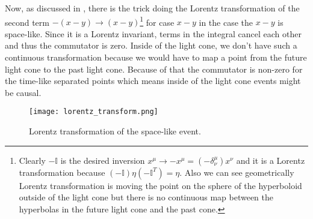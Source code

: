 Now, as discussed in \cite{peskin_schroeder}, there is the trick doing the Lorentz transformation of the second term $-(x - y) \to (x - y)$\footnote{Clearly $-\mathbb{I}$ 
is the desired inversion $x^{\mu} \to -x^{\mu} = (-\delta^{\mu}_{\nu}) x^{\nu}$ and it is a Lorentz transformation because $(-\mathbb{I}) \eta 
(-\mathbb{I}^{T}) = \eta$. Also we can see geometrically Lorentz transformation is moving the point on the sphere of the hyperboloid outside of the
light cone but there is no continuous map between the hyperbolas in the future light cone and the past cone.} for case $x -  y$ in the case the $x - y$ is space-like. Since it
is a Lorentz invariant, terms in the integral cancel each other and thus the commutator is zero. Inside of the light cone, we don't have such a continuous transformation
because we would have to map a point from the future light cone to the past light cone. Because of that the commutator is non-zero for the time-like separated points which means 
inside of the light cone events might be causal.

\begin{figure}[H]
    \centering
    \texttt{[image: lorentz\_transform.png]}
    \caption{Lorentz transformation of the space-like event.}
    \label{fig:lorentz_transform}
\end{figure}

